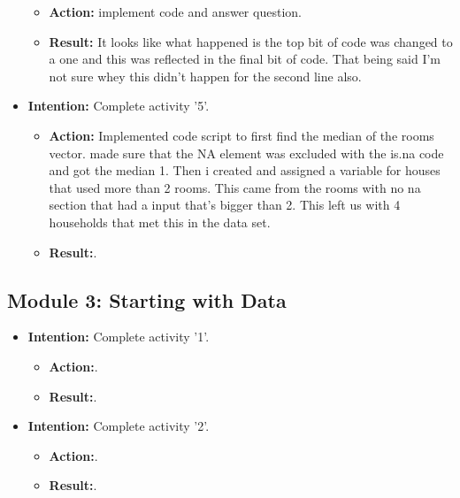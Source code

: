 \documentclass{article}
\begin{document}
\begin{itemize}
\begin{itemize}
\item{\textbf{Action:} implement code and answer question.}
\item{\textbf{Result:} It looks like what happened is the top bit of code was changed to a one and this was reflected in the final bit of code. That being said I'm not sure whey this didn't happen for the second line also.}
\end{itemize}

\item{\textbf{Intention:} Complete activity '5'.}

\begin{itemize}
\item{\textbf{Action:} Implemented code script to first find the median of the rooms vector. made sure that the NA element was excluded with the is.na code and got the median 1. Then i created and assigned a variable for houses that used more than 2 rooms. This came from the rooms with no na section that had a input that's bigger than 2. This left us with 4 households that met this in the data set.}
\item{\textbf{Result:}.}
\end{itemize}



\end{itemize}



\subsection{Module 3: Starting with Data}

\begin{itemize}
 
\item{\textbf{Intention:} Complete activity '1'.}

\begin{itemize}
\item{\textbf{Action:}.}
\item{\textbf{Result:}.}
\end{itemize}


\item{\textbf{Intention:} Complete activity '2'.}

\begin{itemize}
\item{\textbf{Action:}.}
\item{\textbf{Result:}.}
\end{itemize}


\end{itemize}
\end{document}
